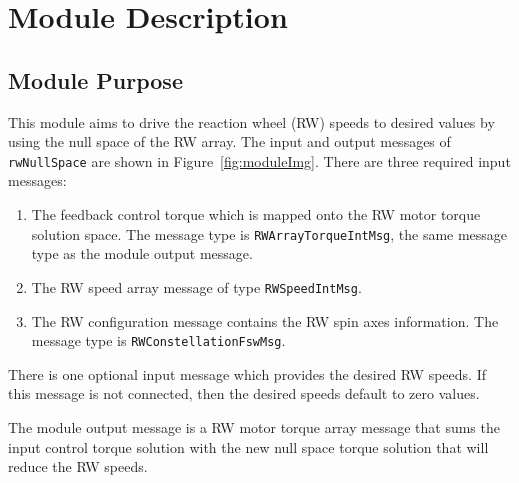



\section{Module Description}
\subsection{Module Purpose}
This module aims to drive the reaction wheel (RW) speeds to desired values by using the null space of the RW array.  The input and output messages of {\tt rwNullSpace} are shown in Figure~\ref{fig:moduleImg}.  There are three required input messages:
\begin{enumerate}
	\item The feedback control torque which is mapped onto the RW motor torque solution space.  The message type is {\tt RWArrayTorqueIntMsg}, the same message type as the module output message.
	\item The RW speed array message of type {\tt RWSpeedIntMsg}.
	\item The RW configuration message contains the RW spin axes information. The message type is {\tt RWConstellationFswMsg}.
\end{enumerate}
There is one optional input message which provides the desired RW speeds.  If this message is not connected, then the desired speeds default to zero values.

The module output message is a RW motor torque array message that sums the input control torque solution with the new null space torque solution that will reduce the RW speeds.  



